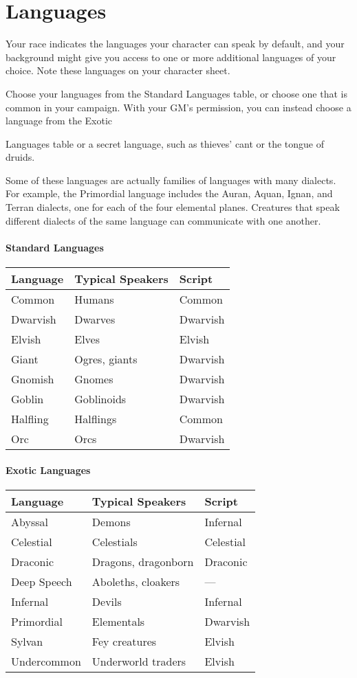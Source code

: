 \documentclass[
]{article}
\date{}
\begin{document}
\hypertarget{languages}{%
\section{Languages}\label{languages}}

Your race indicates the languages your character can speak by default,
and your background might give you access to one or more additional
languages of your choice. Note these languages on your character sheet.

Choose your languages from the Standard Languages table, or choose one
that is common in your campaign. With your GM's permission, you can
instead choose a language from the Exotic

Languages table or a secret language, such as thieves' cant or the
tongue of druids.

Some of these languages are actually families of languages with many
dialects. For example, the Primordial language includes the Auran,
Aquan, Ignan, and Terran dialects, one for each of the four elemental
planes. Creatures that speak different dialects of the same language can
communicate with one another.

\hypertarget{standard-languages}{%
\paragraph{Standard Languages}\label{standard-languages}}

\begin{longtable}[]{@{}lll@{}}
\toprule
Language & Typical Speakers & Script\tabularnewline
\midrule
\endhead
Common & Humans & Common\tabularnewline
Dwarvish & Dwarves & Dwarvish\tabularnewline
Elvish & Elves & Elvish\tabularnewline
Giant & Ogres, giants & Dwarvish\tabularnewline
Gnomish & Gnomes & Dwarvish\tabularnewline
Goblin & Goblinoids & Dwarvish\tabularnewline
Halfling & Halflings & Common\tabularnewline
Orc & Orcs & Dwarvish\tabularnewline
\bottomrule
\end{longtable}

\hypertarget{exotic-languages}{%
\paragraph{Exotic Languages}\label{exotic-languages}}

\begin{longtable}[]{@{}lll@{}}
\toprule
Language & Typical Speakers & Script\tabularnewline
\midrule
\endhead
Abyssal & Demons & Infernal\tabularnewline
Celestial & Celestials & Celestial\tabularnewline
Draconic & Dragons, dragonborn & Draconic\tabularnewline
Deep Speech & Aboleths, cloakers & ---\tabularnewline
Infernal & Devils & Infernal\tabularnewline
Primordial & Elementals & Dwarvish\tabularnewline
Sylvan & Fey creatures & Elvish\tabularnewline
Undercommon & Underworld traders & Elvish\tabularnewline
\bottomrule
\end{longtable}
\end{document}

